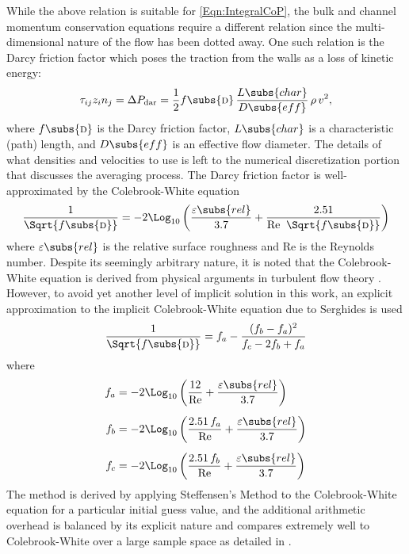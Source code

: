While the above relation is suitable for \cref{Eqn:IntegralCoP}, the bulk and channel momentum conservation equations require a different relation since the multi-dimensional nature of the flow has been dotted away.
One such relation is the Darcy friction factor which poses the traction from the walls as a loss of kinetic energy:
\begin{equation}
    \tau_{ij} z_i n_j = \Delta{P}_{\text{dar}} = \frac{1}{2}
        f\subs{\textsc{d}}\,\frac{L\subs{char}}{D\subs{eff}}\,\rho\,v^2,
\end{equation}
where $f\subs{\textsc{d}}$ is the Darcy friction factor, $L\subs{char}$ is a characteristic (path) length, and $D\subs{eff}$ is an effective flow diameter.
The details of what densities and velocities to use is left to the numerical discretization portion that discusses the averaging process.
The Darcy friction factor is well-approximated by the Colebrook-White equation
\begin{equation}
    \frac{1}{\Sqrt{f\subs{\textsc{d}}}} = -2 \Log_{10}\left(\frac{\varepsilon\subs{rel}}{3.7} + \frac{2.51}{\text{Re}\;\;\Sqrt{f\subs{\textsc{d}}}}\right)
\end{equation}
where $\varepsilon\subs{rel}$ is the relative surface roughness and $\text{Re}$ is the Reynolds number.
Despite its seemingly arbitrary nature, it is noted that the Colebrook-White equation is derived from physical arguments in turbulent flow theory \cite{matthew_colebrook-white_1990}.
However, to avoid yet another level of implicit solution in this work, an explicit approximation to the implicit Colebrook-White equation due to Serghides is used
\begin{equation}
    \frac{1}{\Sqrt{f\subs{\textsc{d}}}} = f_a - \frac{(f_b - f_a)^2}{f_c - 2 f_b + f_a}
\end{equation}
where
\begin{subequations}
    \begin{align}
        f_a &= -2 \Log_{10}\left( \frac{12}       {\text{Re}} + \frac{\varepsilon\subs{rel}}{3.7}\right) \\[0.5em]
        f_b &= -2 \Log_{10}\left( \frac{2.51\,f_a}{\text{Re}} + \frac{\varepsilon\subs{rel}}{3.7}\right)\\[0.5em]
        f_c &= -2 \Log_{10}\left( \frac{2.51\,f_b}{\text{Re}} + \frac{\varepsilon\subs{rel}}{3.7}\right)
    \end{align}
\end{subequations}
The method is derived by applying Steffensen's Method to the Colebrook-White equation for a particular initial guess value, and the additional arithmetic overhead is balanced by its explicit nature and compares extremely well to Colebrook-White over a large sample space as detailed in \cite{burden_numerical_2004,winning_explicit_2012}.


